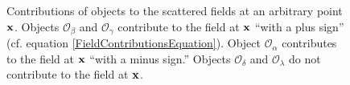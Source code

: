 \begin{figure}
\begin{center}
\caption{Contributions of objects to the scattered fields at 
         an arbitrary point $\mathbf{x}$. Objects $\mathcal{O}_\beta$
         and $\mathcal{O}_\gamma$ contribute
         to the field at $\mathbf{x}$ ``with a plus sign'' 
         (cf. equation \ref{FieldContributionsEquation}).
         Object $\mathcal{O}_\alpha$ 
         contributes to the field at $\mathbf{x}$ ``with a minus
         sign.'' Objects $\mathcal{O}_\delta$ and $\mathcal{O}_\lambda$
         do not contribute to the field at $\mathbf{x}$.}
\label{FieldContributionsFigure}
\end{center}
\end{figure}
